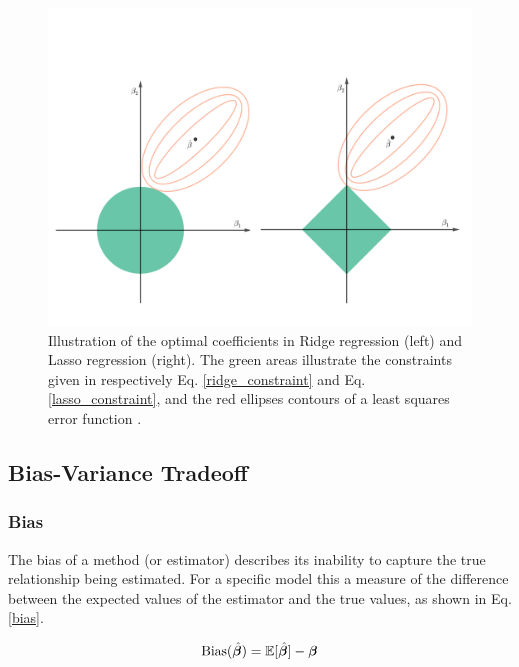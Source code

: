 \begin{figure}[h!]
    \centering
    \includegraphics[width=1\linewidth]{project_1/figures/ridge-lasso.png}
    \caption{Illustration of the optimal coefficients in Ridge regression (left) and Lasso regression (right). The green areas illustrate the constraints given in respectively Eq. \ref{ridge_constraint} and Eq. \ref{lasso_constraint}, and the red ellipses contours of a least squares error function \cite[Recreated from][p. 71]{hastie}.}
    \label{fig:ridge_lasso}
\end{figure}



\subsection{Bias-Variance Tradeoff}\label{bias-var-sec}

\subsubsection{Bias}
The bias of a method (or estimator) describes its inability to capture the true relationship being estimated. For a specific model this a measure of the difference between the expected values of the estimator and the true values, as shown in Eq. \ref{bias}. 

\begin{equation}\label{bias}
    \text{Bias}(\hat{\boldsymbol{\beta}}) = \mathbb{E}[\hat{\boldsymbol{\beta}}]-\boldsymbol{\beta}
\end{equation}

